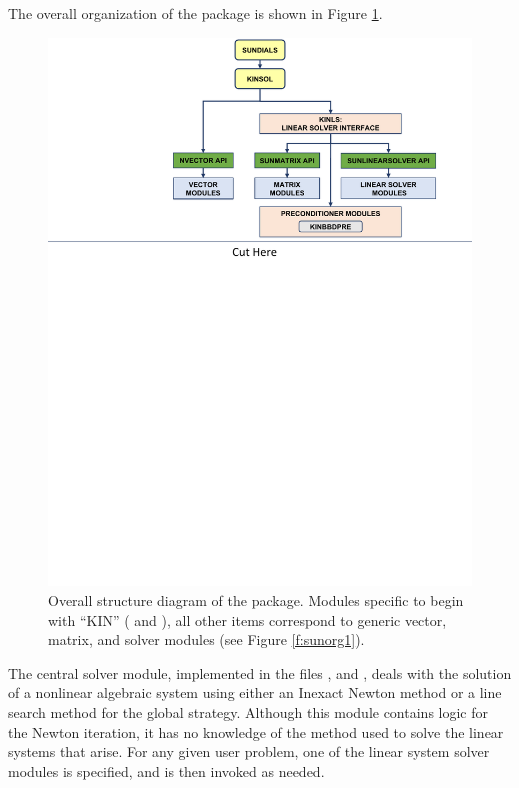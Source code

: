 The overall organization of the {\kinsol} package is shown in Figure
\ref{f:kinorg}.
\begin{figure}[!htb]
{\centerline{\includegraphics[width=\textwidth]{kinorg}}}
\caption [Overall structure diagram of the KINSOL package]
{Overall structure diagram of the {\kinsol} package.
  Modules specific to {\kinsol} begin with ``KIN'' ({\kinls} and {\kinbbdpre}),
  all other items correspond to generic {\sundials} vector, matrix, and solver
  modules (see Figure \ref{f:sunorg1}).}
\label{f:kinorg}
\end{figure}
The central solver module, implemented in the files
,  and , deals with the solution
of a nonlinear algebraic system using either an Inexact Newton method or a
line search method for the global strategy. Although this module contains logic
for the Newton iteration, it has no knowledge of the method used to solve the
linear systems that arise. For any given user problem, one of the linear system
solver modules is specified, and is then invoked as needed.

